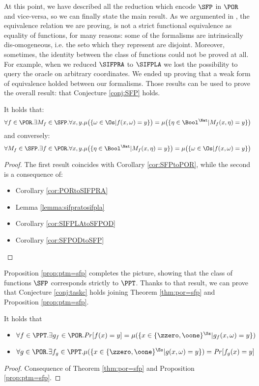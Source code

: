 At this point, we have described all the reduction which encode $\SFP$ in $\POR$
and vice-versa, so we can finally state the main result.
%
As we argumented in ,
the equivalence relation we are proving, is not a strict functional equivalence
as equality of functions, for many reasons: some of the formalisms are
intrinsically dis-omogeneous, i.e. the seto which they represent are disjoint.
%
Moreover, sometimes, the identity between the class of functions could
not be proved at all. For example, when we reduced $\SIFPRA$ to $\SIFPLA$ we
lost the possibility to query the oracle on arbitrary coordinates.
%
We ended up proving that a weak form of equivalence holded between our formalisms.
Those results can be used to prove the overall result: that Conjecture \ref{conj:SFP}
holds.

\begin{theorem}
  \label{thm:por=sfp}
  It holds that:
  \[
  \forall f\in \POR. \exists M_f \in \SFP.
  \forall x, y.\mu\big( \{\omega \in \Os | f(x, \omega)=y\} \big)=
  \mu \big(\{\eta \in \Bool^\Nat | M_f(x, \eta)=y\}\big)
  \]
  and conversely:
  \[
  \forall M_f \in \SFP. \exists f\in \POR.
  \forall x, y.\mu \big(\{\eta \in \Bool^\Nat | M_f(x, \eta)=y\}\big)=
  \mu\big( \{\omega \in \Os | f(x, \omega)=y\} \big)
  \]
\end{theorem}

\begin{proof}
  The first result coincides with Corollary \ref{cor:SFPtoPOR}, while the second
  is a consequence of:
  \begin{itemize}
    \item Corollary \ref{cor:PORtoSIFPRA}
    \item Lemma \ref{lemma:sifpratosifpla}
    \item Corollary \ref{cor:SIFPLAtoSFPOD}
    \item Corollary \ref{cor:SFPODtoSFP}
  \end{itemize}
\end{proof}

Proposition \ref{prop:ptm=sfp} completes the picture, showing that the class of
functions $\SFP$ corresponds strictly to $\PPT$. Thanks to that result, we can prove
that Conjecture \ref{conj:taskc} holds joining Theorem \ref{thm:por=sfp} and
Proposition \ref{prop:ptm=sfp}.

\begin{theorem}
It holds that
  \begin{itemize}
    \item $\forall f\in \PPT. \exists g_f \in \POR. \mathit{Pr}[f(x)=y]=
    \mu(\{x \in \{\zzero, \oone\}^\Ss | g_f(x, \omega)=y\})$
    \item $\forall g \in \POR. \exists f_g \in \PPT.
     \mu(\{x \in \{\zzero, \oone\}^\Ss | g(x, \omega)=y\})=\mathit{Pr}[f_g(x)=y]$
  \end{itemize}
\end{theorem}

\begin{proof}
  Consequence of Theorem \ref{thm:por=sfp} and Proposition \ref{prop:ptm=sfp}.
\end{proof}
